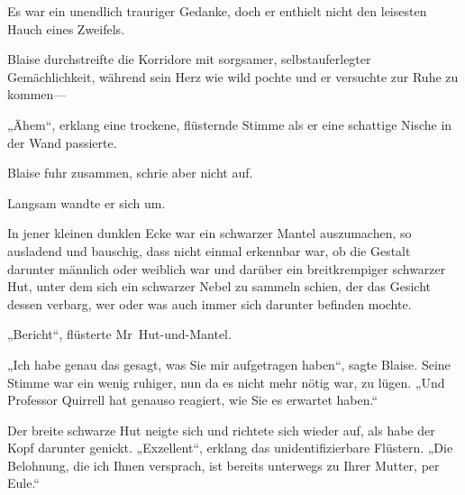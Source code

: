 Es war ein unendlich trauriger Gedanke, doch er enthielt nicht den leisesten Hauch eines Zweifels.


Blaise durchstreifte die Korridore mit sorgsamer, selbstauferlegter Gemächlichkeit, während sein Herz wie wild pochte und er versuchte zur Ruhe zu kommen—

„Ähem“, erklang eine trockene, flüsternde Stimme als er eine schattige Nische in der Wand passierte.

Blaise fuhr zusammen, schrie aber nicht auf.

Langsam wandte er sich um.

In jener kleinen dunklen Ecke war ein schwarzer Mantel auszumachen, so ausladend und bauschig, dass nicht einmal erkennbar war, ob die Gestalt darunter männlich oder weiblich war und darüber ein breitkrempiger schwarzer Hut, unter dem sich ein schwarzer Nebel zu sammeln schien, der das Gesicht dessen verbarg, wer oder was auch immer sich darunter befinden mochte.

„Bericht“, flüsterte Mr~Hut-und-Mantel.

„Ich habe genau das gesagt, was Sie mir aufgetragen haben“, sagte Blaise. Seine Stimme war ein wenig ruhiger, nun da es nicht mehr nötig war, zu lügen. „Und Professor Quirrell hat genauso reagiert, wie Sie es erwartet haben.“

Der breite schwarze Hut neigte sich und richtete sich wieder auf, als habe der Kopf darunter genickt. „Exzellent“, erklang das unidentifizierbare Flüstern. „Die Belohnung, die ich Ihnen versprach, ist bereits unterwegs zu Ihrer Mutter, per Eule.“

